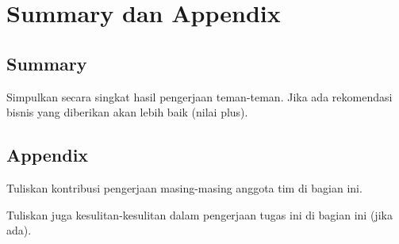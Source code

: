 \section{Summary dan Appendix}

\subsection{Summary}
Simpulkan secara singkat hasil pengerjaan teman-teman. Jika ada rekomendasi bisnis yang diberikan akan lebih baik (nilai plus).

\subsection{Appendix}
Tuliskan kontribusi pengerjaan masing-masing anggota tim di bagian ini.

Tuliskan juga kesulitan-kesulitan dalam pengerjaan tugas ini di bagian ini (jika ada).
